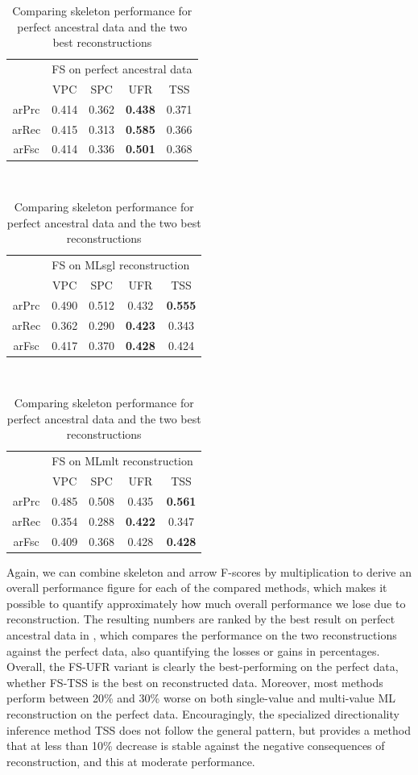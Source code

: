 \begin{table}
 \centering
  \begin{tabular}{ccccc}
    \hline \hline
   & \multicolumn{4}{l}{FS on perfect ancestral data}\\ 
   & VPC & SPC & UFR & TSS\\ \hline
  arPrc & 0.414 & 0.362 & \textbf{0.438} & 0.371\\
  arRec & 0.415 & 0.313 & \textbf{0.585} & 0.366\\
  arFsc & 0.414 & 0.336 & \textbf{0.501} & 0.368\\
  \hline
 \end{tabular}\\[0.5cm]
 \begin{tabular}{ccccc}
  \hline \hline
   & \multicolumn{4}{l}{FS on MLsgl reconstruction}\\ 
   & VPC & SPC & UFR & TSS\\ \hline
  arPrc & 0.490 & 0.512 & 0.432 & \textbf{0.555}\\
  arRec & 0.362 & 0.290 & \textbf{0.423} & 0.343\\
  arFsc & 0.417 & 0.370 & \textbf{0.428} & 0.424\\
  \hline
 \end{tabular}\\[0.5cm]
 \begin{tabular}{ccccc}
  \hline \hline
   & \multicolumn{4}{l}{FS on MLmlt reconstruction}\\ 
   & VPC & SPC & UFR & TSS\\ \hline
  arPrc & 0.485 & 0.508 & 0.435 & \textbf{0.561}\\
  arRec & 0.354 & 0.288 & \textbf{0.422} & 0.347\\
  arFsc & 0.409 & 0.368 & 0.428 & \textbf{0.428}\\
  \hline
 \end{tabular}
 \caption{Comparing skeleton performance for perfect ancestral data and the two best reconstructions}
 \label{perfect-vs-reconstruction-arrows}
\end{table}

Again, we can combine skeleton and arrow F-scores by multiplication to derive an overall performance figure for each of the compared methods, which makes it possible to quantify approximately how much overall performance we lose due to reconstruction. The resulting numbers are ranked by the best result on perfect ancestral data in , which compares the performance on the two reconstructions against the perfect data, also quantifying the losses or gains in percentages. Overall, the FS-UFR variant is clearly the best-performing on the perfect data, whether FS-TSS is the best on reconstructed data. Moreover, most methods perform between 20\% and 30\% worse on both single-value and multi-value ML reconstruction on the perfect data. Encouragingly, the specialized directionality inference method TSS does not follow the general pattern, but provides a method that at less than 10\% decrease is stable against the negative consequences of reconstruction, and this 
at moderate performance.

